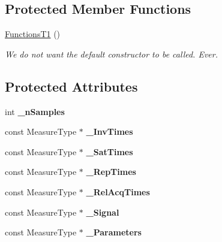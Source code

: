 \subsection*{Protected Member Functions}
\begin{DoxyCompactItemize}
\item 
\mbox{\label{class_ox_1_1_functions_t1_a7dae9dc71ec97e9eef1308c9937aaaf0}} 
\mbox{\hyperlink{class_ox_1_1_functions_t1_a7dae9dc71ec97e9eef1308c9937aaaf0}{Functions\+T1}} ()
\begin{DoxyCompactList}\small\item\em We do not want the default constructor to be called. Ever. \end{DoxyCompactList}\end{DoxyCompactItemize}
\subsection*{Protected Attributes}
\begin{DoxyCompactItemize}
\item 
\mbox{\label{class_ox_1_1_functions_t1_a32038248ea53c223d9d99cd9cee36378}} 
int {\bfseries \+\_\+n\+Samples}
\item 
\mbox{\label{class_ox_1_1_functions_t1_a4e92c3f06b7ef0327d6625a662db4d1c}} 
const Measure\+Type $\ast$ {\bfseries \+\_\+\+Inv\+Times}
\item 
\mbox{\label{class_ox_1_1_functions_t1_a094382559b692b554e8ad1453c27ee50}} 
const Measure\+Type $\ast$ {\bfseries \+\_\+\+Sat\+Times}
\item 
\mbox{\label{class_ox_1_1_functions_t1_a719873f2f02b6dcf0ae100f9c9a6884f}} 
const Measure\+Type $\ast$ {\bfseries \+\_\+\+Rep\+Times}
\item 
\mbox{\label{class_ox_1_1_functions_t1_abfbc38cf7ea0bbc1b52f48a75f281246}} 
const Measure\+Type $\ast$ {\bfseries \+\_\+\+Rel\+Acq\+Times}
\item 
\mbox{\label{class_ox_1_1_functions_t1_a8f87abd26c39fddd3e2b0085e97c6571}} 
const Measure\+Type $\ast$ {\bfseries \+\_\+\+Signal}
\item 
\mbox{\label{class_ox_1_1_functions_t1_acf6e28349ace33d9874b3698e8a3b1e2}} 
const Measure\+Type $\ast$ {\bfseries \+\_\+\+Parameters}
\end{DoxyCompactItemize}


